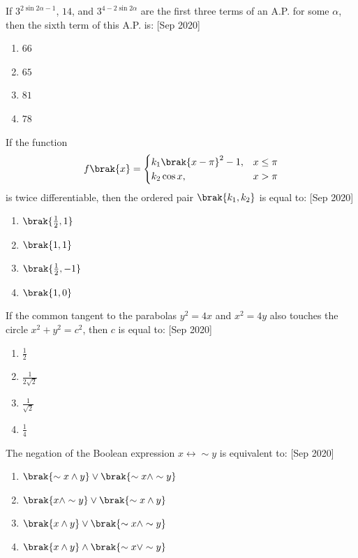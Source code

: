     \item If $3 ^ {2 \sin 2\alpha - 1}$, $14$, and $3 ^ {4 - 2 \sin 2\alpha}$ are the first three terms of an A.P. for some $\alpha$, then the sixth term of this A.P. is:
        \hfill{[Sep 2020]}
    \begin{enumerate}
        \item $66$
        \item $65$
        \item $81$
        \item $78$
    \end{enumerate}

    \item If the function 
    \begin{equation*}
    f\brak{x} = 
    \begin{cases}
    k_1 \brak{x-\pi}^2 -1, & x \leq \pi \\
    k_2 \cos x, & x > \pi
    \end{cases}
    \end{equation*}
    is twice differentiable, then the ordered pair $\brak{k_1, k_2}$ is equal to:
    \hfill{[Sep 2020]}
    \begin{enumerate}
        \item $\brak{\frac{1}{2}, 1}$
        \item $\brak{1, 1}$
        \item $\brak{\frac{1}{2}, -1}$
        \item $\brak{1, 0}$
    \end{enumerate}

    \item If the common tangent to the parabolas $y^2 = 4x$ and $x^2 = 4y$ also touches the circle $x^2 + y^2 = c^2$, then $c$ is equal to:
    \hfill{[Sep 2020]}
    \begin{enumerate}
        \item $\frac{1}{2}$
        \item $\frac{1}{2\sqrt{2}}$
        \item $\frac{1}{\sqrt{2}}$
        \item $\frac{1}{4}$
    \end{enumerate}

    \item The negation of the Boolean expression $x \leftrightarrow \sim y$ is equivalent to:
    \hfill{[Sep 2020]}
    \begin{enumerate}
        \item $\brak{\sim x \land y} \lor \brak{\sim x \land \sim y}$
        \item $\brak{x \land \sim y} \lor \brak{\sim x \land y}$
        \item $\brak{x \land y} \lor \brak{\sim x \land \sim y}$
        \item $\brak{x \land y} \land \brak{\sim x \lor \sim y}$
    \end{enumerate}

